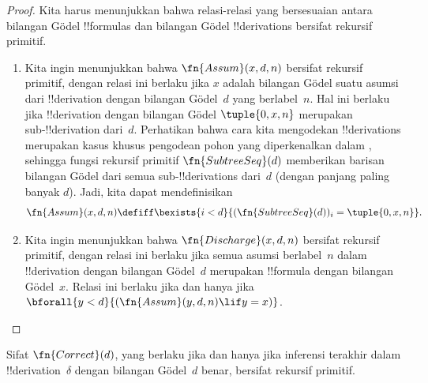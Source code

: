 \documentclass[../../../include/open-logic-section]{subfiles}
\begin{document}
\begin{proof}
  Kita harus menunjukkan bahwa relasi-relasi yang bersesuaian antara bilangan
  G\"odel !!{formula}s dan bilangan G\"odel !!{derivation}s bersifat rekursif
  primitif.
  \begin{enumerate}
  \item Kita ingin menunjukkan bahwa $\fn{Assum}(x, d, n)$ bersifat rekursif
    primitif, dengan relasi ini berlaku jika $x$ adalah bilangan G\"odel suatu
    asumsi dari !!{derivation} dengan bilangan G\"odel~$d$ yang berlabel~$n$.
    Hal ini berlaku jika !!{derivation} dengan bilangan G\"odel
    $\tuple{0, x, n}$ merupakan sub-!!{derivation} dari~$d$. Perhatikan bahwa
    cara kita mengodekan !!{derivation}s merupakan kasus khusus pengodean pohon
    yang diperkenalkan dalam , sehingga fungsi
    rekursif primitif $\fn{SubtreeSeq}(d)$ memberikan barisan bilangan G\"odel
    dari semua sub-!!{derivation}s dari~$d$ (dengan panjang paling banyak $d$).
    Jadi, kita dapat mendefinisikan
    \[
    \fn{Assum}(x, d, n) \defiff \bexists{i<d}{(\fn{SubtreeSeq}(d))_i =
      \tuple{0, x, n}}.
    \]
  \item Kita ingin menunjukkan bahwa $\fn{Discharge}(x, d, n)$ bersifat
    rekursif primitif, dengan relasi ini berlaku jika semua asumsi berlabel~$n$
    dalam !!{derivation} dengan bilangan G\"odel~$d$ merupakan !!{formula}
    dengan bilangan G\"odel~$x$. Relasi ini berlaku jika dan hanya jika
    $\bforall{y<d}{(\fn{Assum}(y, d, n) \lif y = x)}$.
  \end{enumerate}
\end{proof}

\begin{prop}
  Sifat $\fn{Correct}(d)$, yang berlaku jika dan hanya jika inferensi terakhir
  dalam !!{derivation}~$\delta$ dengan bilangan G\"odel~$d$ benar, bersifat
  rekursif primitif.
\end{prop}
\end{document}
